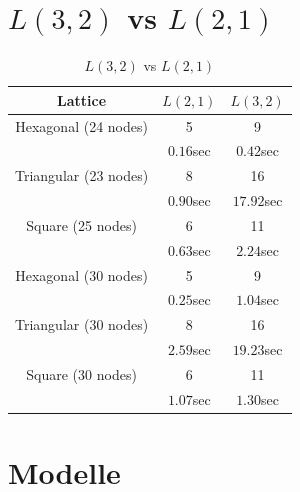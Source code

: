 \documentclass[
	fontsize=12pt,
	paper=a4,
	twoside=false,
	numbers=noenddot,
	plainheadsepline,
	toc=listof,
	toc=bibliography
]{scrartcl}
\begin{document}
\newpage
\section{$L(3,2)$ vs $L(2,1)$}


\begin{table}[htbp]
\centering
\begin{tabular}{|c|c|c|}
	\hline
	 
	 Lattice                & $L(2,1)$  & $L(3,2)$     \\ \hline 
	 Hexagonal (24 nodes)   & 5	 & 9  \\ 
			        & $0.16$sec	 & $0.42$sec  \\ \hline
	 Triangular (23 nodes)  & 8	 & 16  \\ 
			        & $0.90$sec	 & $17.92$sec  \\ \hline
	 Square (25 nodes)      & 6	 & 11  \\ 
			        & $0.63$sec	 & $2.24$sec  \\ \hline
	 Hexagonal (30 nodes)   & 5	 & 9  \\ 
			        & $0.25$sec	 & $1.04$sec  \\ \hline
	 Triangular (30 nodes)  & 8	 & 16  \\ 
			        & $2.59$sec	 & $19.23$sec  \\ \hline
	 Square (30 nodes)      & 6	 & 11  \\ 
			        & $1.07$sec	 & $1.30$sec  \\ \hline			       

\end{tabular}
\caption{$L(3,2)$ vs $L(2,1)$} 
\label{Table:TG3}
\end{table}

\FloatBarrier 

\newpage
\section{Modelle}
\end{document}
